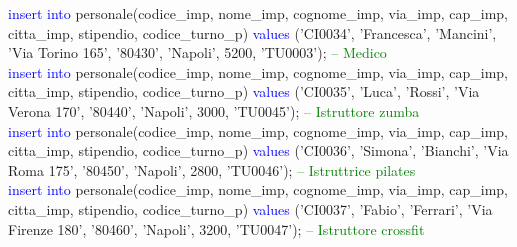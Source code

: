 \documentclass{article}
\begin{document}
\begin{flushleft}
{        \vspace{2mm}
        \hspace*{0.5em}\textcolor{blue}{insert into} personale(codice\_imp, nome\_imp, cognome\_imp, via\_imp, cap\_imp, \hspace*{0.5em}citta\_imp, stipendio, codice\_turno\_p) \textcolor{blue}{values} ('CI0034', 'Francesca', 'Mancini', \hspace*{0.5em}'Via Torino \hspace*{0.5em}165', '80430', 'Napoli', 5200, 'TU0003'); \hspace*{0.5em} \textcolor{green}{-- Medico} \\
        \vspace{2mm}
        \hspace*{0.5em}\textcolor{blue}{insert into} personale(codice\_imp, nome\_imp, cognome\_imp, via\_imp, cap\_imp, \hspace*{0.5em}citta\_imp, stipendio, codice\_turno\_p) \textcolor{blue}{values} ('CI0035', 'Luca', 'Rossi', 'Via \hspace*{0.5em}Verona 170', \hspace*{0.5em}'80440', 'Napoli', 3000, 'TU0045'); \hspace*{0.5em} \textcolor{green}{-- Istruttore zumba} \\
        \vspace{2mm}
        \hspace*{0.5em}\textcolor{blue}{insert into} personale(codice\_imp, nome\_imp, cognome\_imp, via\_imp, cap\_imp, \hspace*{0.5em}citta\_imp, stipendio, codice\_turno\_p) \textcolor{blue}{values} ('CI0036', 'Simona', 'Bianchi', 'Via \hspace*{0.5em}Roma 175', \hspace*{0.5em}'80450', 'Napoli', 2800, 'TU0046'); \hspace*{0.5em} \textcolor{green}{-- Istruttrice pilates} \\
        \vspace{2mm}
        \hspace*{0.5em}\textcolor{blue}{insert into} personale(codice\_imp, nome\_imp, cognome\_imp, via\_imp, cap\_imp, \hspace*{0.5em}citta\_imp, stipendio, codice\_turno\_p) \textcolor{blue}{values} ('CI0037', 'Fabio', 'Ferrari', 'Via \hspace*{0.5em}Firenze 180', \hspace*{0.5em}'80460', 'Napoli', 3200, 'TU0047'); \hspace*{0.5em} \textcolor{green}{-- Istruttore crossfit} \\
}
\end{flushleft}
\end{document}
